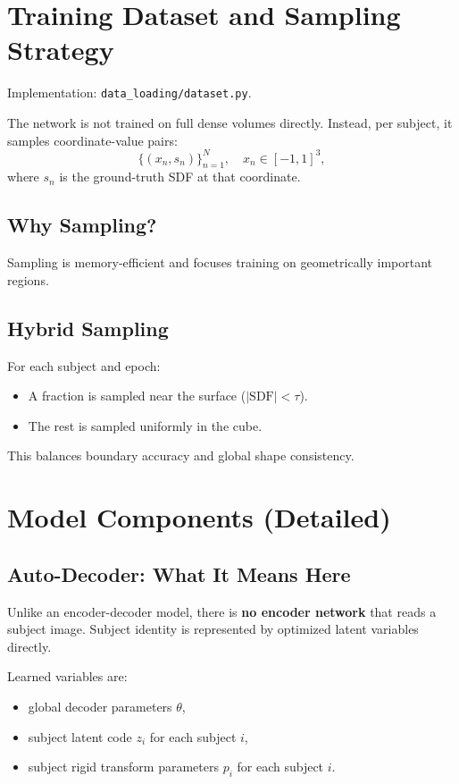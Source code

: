 ﻿\documentclass[11pt]{article}
\begin{document}
\section{Training Dataset and Sampling Strategy}
Implementation: \texttt{data\_loading/dataset.py}.

The network is not trained on full dense volumes directly. Instead, per subject, it samples coordinate-value pairs:
\begin{equation}
\{(x_n, s_n)\}_{n=1}^{N}, \quad x_n\in[-1,1]^3,
\end{equation}
where $s_n$ is the ground-truth SDF at that coordinate.

\subsection{Why Sampling?}
Sampling is memory-efficient and focuses training on geometrically important regions.

\subsection{Hybrid Sampling}
For each subject and epoch:
\begin{itemize}[leftmargin=*]
    \item A fraction is sampled near the surface ($|\mathrm{SDF}|<\tau$).
    \item The rest is sampled uniformly in the cube.
\end{itemize}
This balances boundary accuracy and global shape consistency.

\section{Model Components (Detailed)}
\subsection{Auto-Decoder: What It Means Here}
Unlike an encoder-decoder model, there is \textbf{no encoder network} that reads a subject image. Subject identity is represented by optimized latent variables directly.

Learned variables are:
\begin{itemize}[leftmargin=*]
    \item global decoder parameters $\theta$,
    \item subject latent code $z_i$ for each subject $i$,
    \item subject rigid transform parameters $p_i$ for each subject $i$.
\end{itemize}
\end{document}
